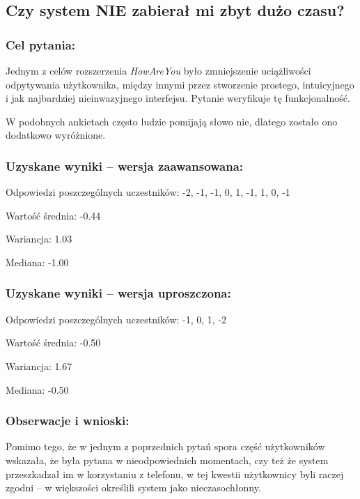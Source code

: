 	
	
\subsection{Czy system NIE zabierał mi zbyt dużo czasu?}
	
	\subsubsection{Cel pytania:}
	
	Jednym z celów rozszerzenia \textit{HowAreYou} było zmniejszenie uciążliwości odpytywania użytkownika, między innymi przez stworzenie prostego, intuicyjnego i jak najbardziej nieinwazyjnego interfejsu. Pytanie weryfikuje tę funkcjonalność.
	
	W podobnych ankietach często ludzie pomijają słowo nie, dlatego zostało ono dodatkowo wyróżnione.
	
	\subsubsection{Uzyskane wyniki -- wersja zaawansowana:}
	
	Odpowiedzi poszczególnych uczestników: -2, -1, -1, 0, 1, -1, 1, 0, -1
	
	Wartość średnia: -0.44
	
	Wariancja: 1.03
	
	Mediana: -1.00
	
	\subsubsection{Uzyskane wyniki -- wersja uproszczona:}
	
	Odpowiedzi poszczególnych uczestników: -1, 0, 1, -2
	
	Wartość średnia: -0.50
	
	Wariancja: 1.67
	
	Mediana: -0.50
	
	\subsubsection{Obserwacje i wnioski:}
	
	Pomimo tego, że w jednym z poprzednich pytań spora część użytkowników wskazała, że była pytana w nieodpowiednich momentach, czy też że system przeszkadzał im w korzystaniu z telefonu, w tej kwestii użytkownicy byli raczej zgodni -- w większości określili system jako nieczasochłonny.
	
